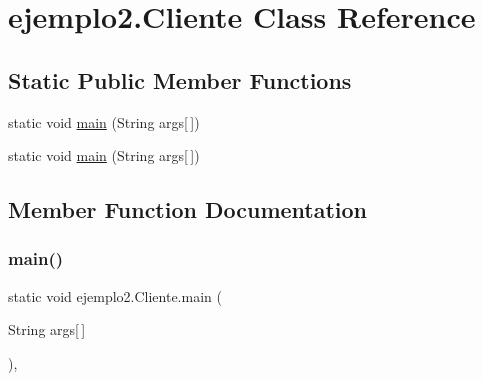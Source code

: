 \hypertarget{classejemplo2_1_1_cliente}{}\section{ejemplo2.\+Cliente Class Reference}
\label{classejemplo2_1_1_cliente}
\subsection*{Static Public Member Functions}
\begin{DoxyCompactItemize}
\item 
static void \mbox{\hyperlink{classejemplo2_1_1_cliente_aefe0b8e5b3bae99a9bd00f3dedda11e2}{main}} (String args\mbox{[}$\,$\mbox{]})
\item 
static void \mbox{\hyperlink{classejemplo2_1_1_cliente_aefe0b8e5b3bae99a9bd00f3dedda11e2}{main}} (String args\mbox{[}$\,$\mbox{]})
\end{DoxyCompactItemize}


\subsection{Member Function Documentation}
\mbox{\label{classejemplo2_1_1_cliente_aefe0b8e5b3bae99a9bd00f3dedda11e2}} 
\subsubsection{\texorpdfstring{main()}{main()}\hspace{0.1cm}{\footnotesize\ttfamily [1/2]}}
{\footnotesize\ttfamily static void ejemplo2.\+Cliente.\+main (\begin{DoxyParamCaption}\item[{String}]{args\mbox{[}$\,$\mbox{]} }\end{DoxyParamCaption})\hspace{0.3cm}{\ttfamily [inline]}, {\ttfamily [static]}}


